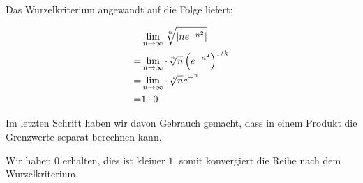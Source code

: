 \item Das Wurzelkriterium angewandt auf die Folge liefert:

\begin{alignat*}{1}
	  &\lim\limits_{n\to\infty} \nroot{n}{\left|n e^{-n^2}\right|} \\
	= & \lim\limits_{n\to\infty} \cdot \nroot{n}{n} \left(e^{-n^2}\right)^{1/k} \\
	= & \lim\limits_{n\to\infty} \cdot \nroot{n}{n} e^{-^n} \\
	= & 1 \cdot 0
\end{alignat*}

Im letzten Schritt haben wir davon Gebrauch gemacht, dass in einem Produkt die Grenzwerte separat berechnen kann.

Wir haben $0$ erhalten, dies ist kleiner $1$, somit konvergiert die Reihe nach dem Wurzelkriterium.
